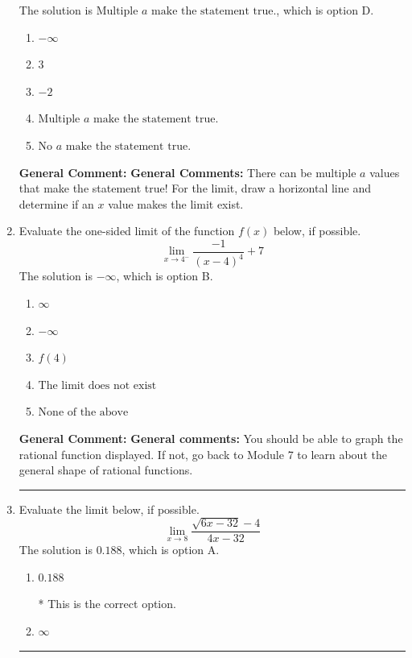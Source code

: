 \documentclass{extbook}[14pt]
\newcommand{\litem}[1]{\item #1

\rule{\textwidth}{0.4pt}}
\begin{document}
\begin{enumerate}
{The solution is \( \text{Multiple } a \text{ make the statement true}. \), which is option D.\begin{enumerate}[label=\Alph*.]
\item \( -\infty \)


\item \( 3 \)


\item \( -2 \)


\item \( \text{Multiple } a \text{ make the statement true}. \)


\item \( \text{No } a \text{ make the statement true}. \)


\end{enumerate}

\textbf{General Comment:} \textbf{General Comments:} There can be multiple $a$ values that make the statement true! For the limit, draw a horizontal line and determine if an $x$ value makes the limit exist.
}
\litem{
Evaluate the one-sided limit of the function $f(x)$ below, if possible.
\[ \lim_{x \rightarrow 4^-} \frac{-1}{(x-4)^4}+7 \]The solution is \( -\infty \), which is option B.\begin{enumerate}[label=\Alph*.]
\item \( \infty \)


\item \( -\infty \)


\item \( f(4) \)


\item \( \text{The limit does not exist} \)


\item \( \text{None of the above} \)


\end{enumerate}

\textbf{General Comment:} \textbf{General comments:} You should be able to graph the rational function displayed. If not, go back to Module 7 to learn about the general shape of rational functions.
}
\litem{
Evaluate the limit below, if possible.
\[ \lim_{x \rightarrow 8} \frac{\sqrt{6x - 32} - 4}{4x - 32} \]The solution is \( 0.188 \), which is option A.\begin{enumerate}[label=\Alph*.]
\item \( 0.188 \)

* This is the correct option.
\item \( \infty \)


\end{enumerate}}
\end{enumerate}
\end{document}

